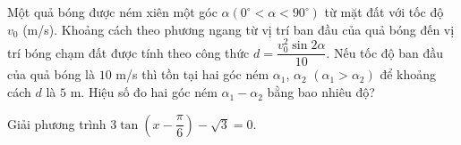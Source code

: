\begin{ex}%
	Một quả bóng được ném xiên một góc $\alpha\left(0^{\circ} < \alpha < 90^{\circ}\right)$ từ mặt đất với tốc độ $v_0$ (m/s). Khoảng cách theo phương ngang từ vị trí ban đầu của quả bóng đến vị trí bóng chạm đất được tính theo công thức $d=\dfrac{v_0^2\sin 2\alpha}{10}$. Nếu tốc độ ban đầu của quả bóng là $10$ m/s thì tồn tại hai góc ném $\alpha_1$, $\alpha_2$ $\left(\alpha_1 > \alpha_2\right)$ để khoảng cách $d$ là $5$ m. Hiệu số đo hai góc ném $\alpha_1-\alpha_2$ bằng bao nhiêu độ?
\end{ex}

\begin{ex}%
	Giải phương trình $ 3\tan \left(x-\dfrac{\pi}{6}\right)-\sqrt 3=0$.
\end{ex}


